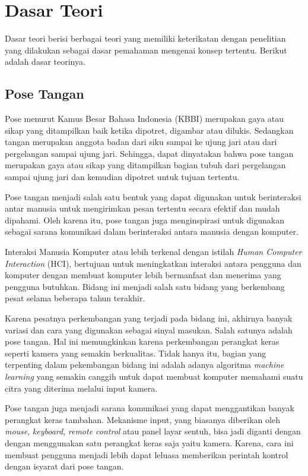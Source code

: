 \section{Dasar Teori}
\label{sec:dasarteori}
Dasar teori berisi berbagai teori yang memiliki keterikatan dengan penelitian yang dilakukan sebagai dasar pemahaman mengenai konsep tertentu. Berikut adalah dasar teorinya.

\subsection{Pose Tangan}

Pose menurut Kamus Besar Bahasa Indonesia (KBBI) merupakan gaya atau sikap yang ditampilkan baik ketika dipotret, digambar atau dilukis. Sedangkan tangan merupakan anggota badan dari siku sampai ke ujung jari atau dari pergelangan sampai ujung jari. Sehingga, dapat dinyatakan bahwa pose tangan merupakan gaya atau sikap yang ditampilkan bagian tubuh dari pergelangan sampai ujung jari dan kemudian dipotret untuk tujuan tertentu.

Pose tangan menjadi salah satu bentuk yang dapat digunakan untuk berinteraksi antar manusia untuk mengirimkan pesan tertentu secara efektif dan mudah dipahami. Oleh karena itu, pose tangan juga menginspirasi untuk digunakan sebagai sarana komunikasi dalam berinteraksi antara manusia dengan komputer. 

Interaksi Manusia Komputer atau lebih terkenal dengan istilah \emph{Human Computer Interaction} (HCI), bertujuan untuk meningkatkan interaksi antara pengguna dan komputer dengan membuat komputer lebih bermanfaat dan menerima yang pengguna butuhkan. Bidang ini menjadi salah satu bidang yang berkembang pesat selama beberapa tahun terakhir.

Karena pesatnya perkembangan yang terjadi pada bidang ini, akhirnya banyak variasi dan cara yang digunakan sebagai sinyal masukan. Salah satunya adalah pose tangan. Hal ini memungkinkan karena perkembangan perangkat keras seperti kamera yang semakin berkualitas. Tidak hanya itu, bagian yang terpenting dalam pekembangan bidang ini adalah adanya algoritma \emph{machine learning} yang semakin canggih untuk dapat membuat komputer memahami suatu citra yang diterima melalui input kamera. 

Pose tangan juga menjadi sarana komunikasi yang dapat menggantikan banyak perangkat keras tambahan. Mekanisme input, yang biasanya diberikan oleh \emph{mouse}, \emph{keyboard}, \emph{remote control} atau panel layar sentuh, bisa jadi diganti dengan dengan menggunakan satu perangkat keras saja yaitu kamera. Karena, cara ini membuat pengguna menjadi lebih dapat leluasa memberikan perintah kontrol dengan isyarat dari pose tangan. 

